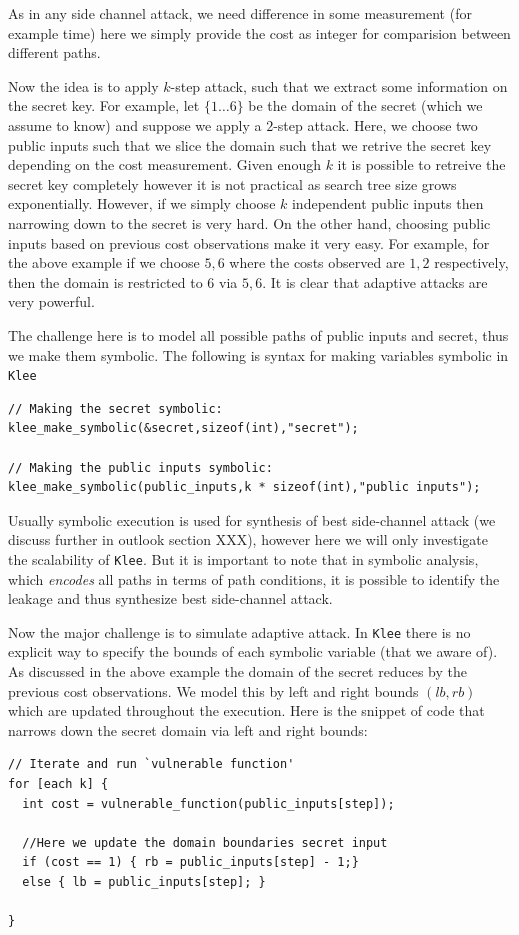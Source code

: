 \documentclass[11pt,a4paper,notitlepage]{article}
\begin{document}
As in any side channel attack, we need difference in some measurement (for example time) here we simply provide the cost as integer for comparision between different paths.

Now the idea is to apply $k$-step attack, such that we extract some information on the secret key.
For example, let $\{1 \dots 6\}$ be the domain of the secret (which we assume to know) and suppose we apply a $2$-step attack.
Here, we choose two public inputs such that we slice the domain such that we retrive the secret key depending on the cost measurement.
Given enough $k$ it is possible to retreive the secret key completely however it is not practical as search tree size grows exponentially.
However, if we simply choose $k$ independent public inputs then narrowing down to the secret is very hard.
On the other hand, choosing public inputs based on previous cost observations make it very easy.
For example, for the above example if we choose ${5,6}$ where the costs observed are ${1,2}$ respectively, then the domain is restricted to ${6}$ via ${5,6}$. It is clear that adaptive attacks are very powerful.

The challenge here is to model all possible paths of public inputs and secret, thus we make them symbolic.
The following is syntax for making variables symbolic in \texttt{Klee}
\begin{verbatim}
// Making the secret symbolic:
klee_make_symbolic(&secret,sizeof(int),"secret");

// Making the public inputs symbolic:
klee_make_symbolic(public_inputs,k * sizeof(int),"public inputs");
\end{verbatim}

Usually symbolic execution is used for synthesis of best side-channel attack (we discuss further in outlook section XXX), however here we will only investigate the scalability of \texttt{Klee}.
But it is important to note that in symbolic analysis, which \emph{encodes} all paths in terms of path conditions, it is possible to identify the leakage and thus synthesize best side-channel attack.

Now the major challenge is to simulate adaptive attack. In \texttt{Klee} there is no explicit way to specify the bounds of each symbolic variable (that we aware of).
As discussed in the above example the domain of the secret reduces by the previous cost observations. We model this by left and right bounds $(lb, rb)$ which are updated throughout the execution.
Here is the snippet of code that narrows down the secret domain via left and right bounds:
\begin{verbatim}
// Iterate and run `vulnerable function'
for [each k] {
  int cost = vulnerable_function(public_inputs[step]);

  //Here we update the domain boundaries secret input
  if (cost == 1) { rb = public_inputs[step] - 1;}
  else { lb = public_inputs[step]; }

}
\end{verbatim}
\end{document}
